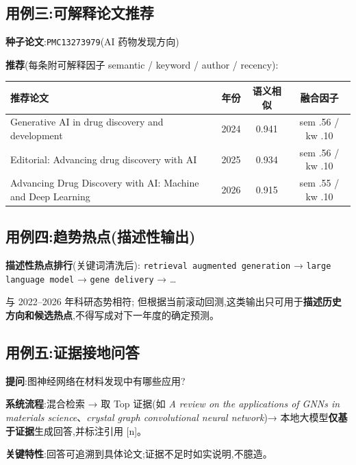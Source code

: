 \subsection{用例三:可解释论文推荐}
\begin{plainbox}
\textbf{种子论文}:\texttt{PMC13273979}(AI 药物发现方向)\par\vspace{2pt}
\textbf{推荐}(每条附可解释因子 semantic / keyword / author / recency):
\begin{tableblock}
\begin{tabularx}{0.9\textwidth}{Xccc}
\toprule
\textbf{推荐论文} & \textbf{年份} & \textbf{语义相似} & \textbf{融合因子} \\
\midrule
Generative AI in drug discovery and development & 2024 & 0.941 & sem .56 / kw .10 \\
Editorial: Advancing drug discovery with AI & 2025 & 0.934 & sem .56 / kw .10 \\
Advancing Drug Discovery with AI: Machine and Deep Learning & 2026 & 0.915 & sem .55 / kw .10 \\
\bottomrule
\end{tabularx}
\end{tableblock}
\end{plainbox}

\subsection{用例四:趋势热点(描述性输出)}
\begin{plainbox}
\textbf{描述性热点排行}(关键词清洗后):
\texttt{retrieval augmented generation} → \texttt{large language model} → \texttt{gene delivery} → \dots\par\vspace{2pt}
与 2022--2026 年科研态势相符; 但根据当前滚动回测,这类输出只可用于\textbf{描述历史方向和候选热点},不得写成对下一年度的确定预测。
\end{plainbox}

\subsection{用例五:证据接地问答}
\begin{plainbox}
\textbf{提问}:图神经网络在材料发现中有哪些应用?\par\vspace{2pt}
\textbf{系统流程}:混合检索 → 取 Top 证据(如 \emph{A review on the applications of GNNs in materials science}、\emph{crystal graph convolutional neural network})→ 本地大模型\textbf{仅基于证据}生成回答,并标注引用 [n]。\par\vspace{2pt}
\textbf{关键特性}:回答可追溯到具体论文;证据不足时如实说明,不臆造。
\end{plainbox}

